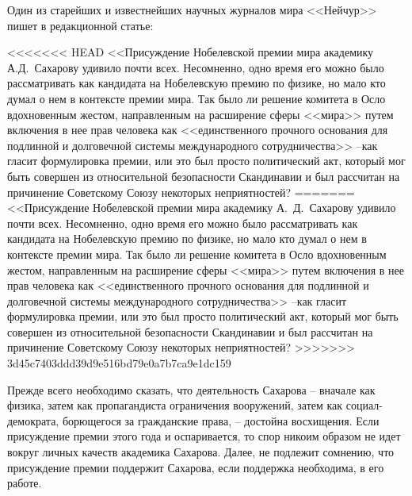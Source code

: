 \documentclass{book}
\begin{document}
{Один из старейших и известнейших научных журналов ми­ра <<Нейчур>> пишет в редакционной статье:

<<<<<<< HEAD
<<Присуждение Нобелевской премии мира академику А.Д.~Сахарову удивило почти всех. Несомненно, одно время его можно было рассматривать как кандидата на Нобелевскую премию по физике, но мало кто думал о нем в контексте премии мира. Так было ли решение комитета в Осло вдохновенным жестом, направленным на расширение сферы <<мира>> путем включения в нее прав человека как <<единственного прочного основания для подлинной и долговечной системы международного сотрудничества>> --как гласит формулировка премии, или это был просто политический акт, который мог быть совершен из относительной безопасности Скандинавии и был рассчитан на причинение Советскому Союзу некоторых неприятностей?
=======
<<Присуждение Нобелевской премии мира академику А.~Д.~Сахарову удивило почти всех. Несомненно, одно время его можно было рассматривать как кандидата на Нобелевскую премию по физике, но мало кто думал о нем в контексте премии мира. Так было ли решение комитета в Осло вдохновенным жестом, направленным на расширение сферы <<мира>> путем включения в нее прав человека как <<единственного прочного основания для подлинной и долговечной системы международного сотрудничества>> --как гласит формулировка премии, или это был просто политический акт, который мог быть совершен из относительной безопасности Скандинавии и был рассчитан на причинение Советскому Союзу некоторых неприятностей?
>>>>>>> 3d45c7403ddd39d9e516bd79e0a7b7ca9e1dc159

Прежде всего необходимо сказать, что деятельность Сахарова -- вначале как физика, затем как пропагандиста ограничения вооружений, затем как социал-демократа, борющегося за гражданские права, -- достойна восхищения. Ес­ли присуждение премии этого года и оспаривается, то спор ни­коим образом не идет вокруг личных качеств академика Са­харова. Далее, не подлежит сомнению, что присуждение пре­мии поддержит Сахарова, если поддержка необходима, в его работе.

}
\end{document}
